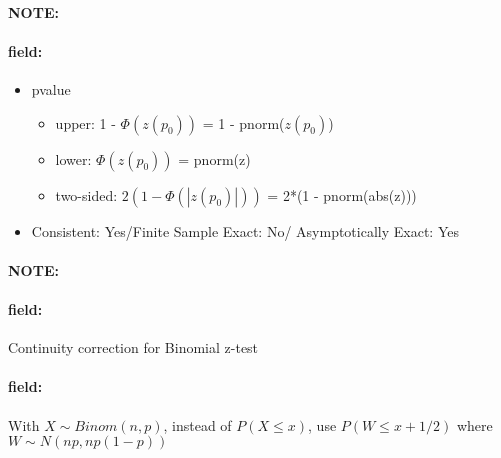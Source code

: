 \documentclass[12pt]{article}
\newenvironment{note}{\paragraph{NOTE:}}{}
\newenvironment{field}{\paragraph{field:}}{}
\begin{document}
\begin{note}
\begin{field}
\begin{itemize}
			\item pvalue
      \begin{itemize}
        \item upper: 1 - $\Phi(z(p_0))$ = 1 - pnorm($z(p_0)$)
        \item lower: $\Phi(z(p_0))$ = pnorm(z)
        \item two-sided: $2(1 - \Phi(|z(p_0)|))$ = 2*(1 - pnorm(abs(z)))
      \end{itemize}
			\item Consistent: Yes/Finite Sample Exact: No/ Asymptotically Exact: Yes
		\end{itemize}
  \end{field}
\end{note}

\begin{note}
  \begin{field}
    Continuity correction for Binomial z-test
  \end{field}
  \begin{field}
    With $X \sim Binom(n,p)$, instead of $P(X \leq x)$, use $P(W \leq x + 1/2)$ where $W \sim N(np,np(1-p))$
  \end{field}
\end{note}
\end{document}
